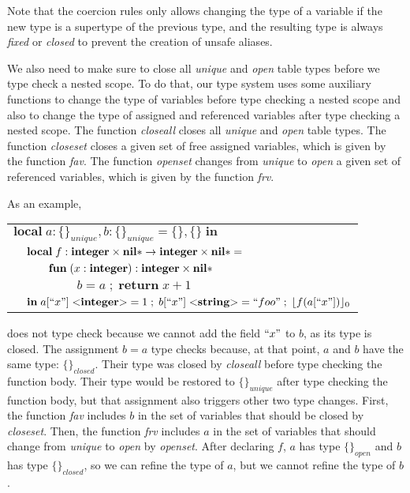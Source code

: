 Note that the coercion rules only allows changing the type
of a variable if the new type is a supertype of the previous type,
and the resulting type is always \emph{fixed} or \emph{closed}
to prevent the creation of unsafe aliases.

We also need to make sure to close all \emph{unique} and \emph{open}
table types before we type check a nested scope.
To do that, our type system uses some auxiliary functions to change
the type of variables before type checking a nested scope and
also to change the type of assigned and referenced variables after
type checking a nested scope.
The function \emph{closeall} closes all \emph{unique} and \emph{open} table types.
The function \emph{closeset} closes a given set of free assigned variables,
which is given by the function \emph{fav}.
The function \emph{openset} changes from \emph{unique} to \emph{open}
a given set of referenced variables, which is given by the function \emph{frv}.

As an example,
\begin{center}
\begin{tabular}{llll}
\multicolumn{4}{l}{$\mathbf{local} \; a:\{\}_{unique}, b:\{\}_{unique} = \{\}, \{\} \; \mathbf{in}$}\\
& \multicolumn{3}{l}{$\mathbf{local} \; f:\mathbf{integer} \times \mathbf{nil}{*} \rightarrow \mathbf{integer} \times \mathbf{nil}{*} =$}\\
& & \multicolumn{2}{l}{$\mathbf{fun} \; (x:\mathbf{integer}):\mathbf{integer} \times \mathbf{nil}{*}$}\\
& & & \multicolumn{1}{l}{$b = a \;;\; \mathbf{return} \; x + 1$}\\
& \multicolumn{3}{l}{$\mathbf{in} \; a[``x"] \; {<}\mathbf{integer}{>} = 1 \;;\; b[``x"] \; {<}\mathbf{string}{>} = ``foo" \;;\; \lfloor f(a[``x"]) \rfloor_{0}$}
\end{tabular}
\end{center}
does not type check because we cannot add the field
$``x"$ to $b$, as its type is closed.
The assignment $b = a$ type checks because, at that point,
$a$ and $b$ have the same type: $\{\}_{closed}$.
Their type was closed by \emph{closeall} before type checking
the function body.
Their type would be restored to $\{\}_{unique}$ after type checking
the function body, but that assignment also triggers other two type changes.
First, the function \emph{fav} includes $b$ in the set of variables
that should be closed by \emph{closeset}.
Then, the function \emph{frv} includes $a$ in the set of variables
that should change from \emph{unique} to \emph{open} by \emph{openset}.
After declaring $f$, $a$ has type $\{\}_{open}$ and $b$ has type $\{\}_{closed}$,
so we can refine the type of $a$, but we cannot refine the type of $b$.

